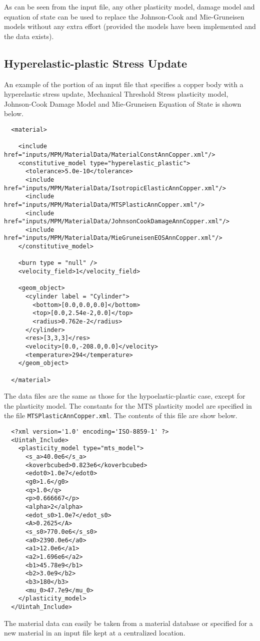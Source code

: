 \documentclass[10pt]{article}
\begin{document}
  As can be seen from the input file, any other plasticity model, damage
  model and equation of state can be used to replace the Johnson-Cook
  and Mie-Gruneisen models without any extra effort (provided the models
  have been implemented and the data exists).

  \subsection{Hyperelastic-plastic Stress Update}
  An example of the portion of an input file that specifies a copper body
  with a hyperelastic stress update, Mechanical Threshold Stress plasticity model,
  Johnson-Cook Damage Model and Mie-Gruneisen Equation of State is shown 
  below.
  \begin{verbatim}
  <material>

    <include href="inputs/MPM/MaterialData/MaterialConstAnnCopper.xml"/>
    <constitutive_model type="hyperelastic_plastic">
      <tolerance>5.0e-10</tolerance>
      <include href="inputs/MPM/MaterialData/IsotropicElasticAnnCopper.xml"/>
      <include href="inputs/MPM/MaterialData/MTSPlasticAnnCopper.xml"/>
      <include href="inputs/MPM/MaterialData/JohnsonCookDamageAnnCopper.xml"/>
      <include href="inputs/MPM/MaterialData/MieGruneisenEOSAnnCopper.xml"/>
    </constitutive_model>

    <burn type = "null" />
    <velocity_field>1</velocity_field>

    <geom_object>
      <cylinder label = "Cylinder">
        <bottom>[0.0,0.0,0.0]</bottom>
        <top>[0.0,2.54e-2,0.0]</top>
        <radius>0.762e-2</radius>
      </cylinder>
      <res>[3,3,3]</res>
      <velocity>[0.0,-208.0,0.0]</velocity>
      <temperature>294</temperature>
    </geom_object>

  </material>
  \end{verbatim}

  The data files are the same as those for the hypoelastic-plastic case, 
  except for the plasticity model.  The constants for the MTS plasticity model
  are specified in the file \verb+MTSPlasticAnnCopper.xml+.  The contents
  of this file are show below.
  \begin{verbatim}
  <?xml version='1.0' encoding='ISO-8859-1' ?>
  <Uintah_Include>
    <plasticity_model type="mts_model">
      <s_a>40.0e6</s_a>
      <koverbcubed>0.823e6</koverbcubed>
      <edot0>1.0e7</edot0>
      <g0>1.6</g0>
      <q>1.0</q>
      <p>0.666667</p>
      <alpha>2</alpha>
      <edot_s0>1.0e7</edot_s0>
      <A>0.2625</A>
      <s_s0>770.0e6</s_s0>
      <a0>2390.0e6</a0>
      <a1>12.0e6</a1>
      <a2>1.696e6</a2>
      <b1>45.78e9</b1>
      <b2>3.0e9</b2>
      <b3>180</b3>
      <mu_0>47.7e9</mu_0>
    </plasticity_model>
  </Uintah_Include>
  \end{verbatim}

  The material data can easily be taken from a material database or specified
  for a new material in an input file kept at a centralized location.

  
  
\end{document}
